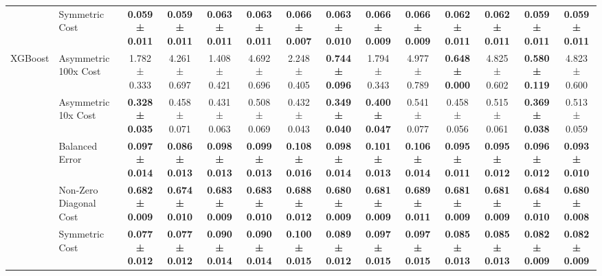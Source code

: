 \begin{table}[H]
{\begin{tabular}{llcccccccccccc}
 & Symmetric Cost & \textbf{0.059 ± 0.011} & \textbf{0.059 ± 0.011} & \textbf{0.063 ± 0.011} & \textbf{0.063 ± 0.011} & \textbf{0.066 ± 0.007} & \textbf{0.063 ± 0.010} & \textbf{0.066 ± 0.009} & \textbf{0.066 ± 0.009} & \textbf{0.062 ± 0.011} & \textbf{0.062 ± 0.011} & \textbf{0.059 ± 0.011} & \textbf{0.059 ± 0.011} \\
\cline{1-14}
\multirow[t]{5}{*}{XGBoost} & Asymmetric 100x Cost & 1.782 ± 0.333 & 4.261 ± 0.697 & 1.408 ± 0.421 & 4.692 ± 0.696 & 2.248 ± 0.405 & \textbf{0.744 ± 0.096} & 1.794 ± 0.343 & 4.977 ± 0.789 & \textbf{0.648 ± 0.000} & 4.825 ± 0.602 & \textbf{0.580 ± 0.119} & 4.823 ± 0.600 \\
 & Asymmetric 10x Cost & \textbf{0.328 ± 0.035} & 0.458 ± 0.071 & 0.431 ± 0.063 & 0.508 ± 0.069 & 0.432 ± 0.043 & \textbf{0.349 ± 0.040} & \textbf{0.400 ± 0.047} & 0.541 ± 0.077 & 0.458 ± 0.056 & 0.515 ± 0.061 & \textbf{0.369 ± 0.038} & 0.513 ± 0.059 \\
 & Balanced Error & \textbf{0.097 ± 0.014} & \textbf{0.086 ± 0.013} & \textbf{0.098 ± 0.013} & \textbf{0.099 ± 0.013} & \textbf{0.108 ± 0.016} & \textbf{0.098 ± 0.014} & \textbf{0.101 ± 0.013} & \textbf{0.106 ± 0.014} & \textbf{0.095 ± 0.011} & \textbf{0.095 ± 0.012} & \textbf{0.096 ± 0.012} & \textbf{0.093 ± 0.010} \\
 & Non-Zero Diagonal Cost & \textbf{0.682 ± 0.009} & \textbf{0.674 ± 0.010} & \textbf{0.683 ± 0.009} & \textbf{0.683 ± 0.010} & \textbf{0.688 ± 0.012} & \textbf{0.680 ± 0.009} & \textbf{0.681 ± 0.009} & \textbf{0.689 ± 0.011} & \textbf{0.681 ± 0.009} & \textbf{0.681 ± 0.009} & \textbf{0.684 ± 0.010} & \textbf{0.680 ± 0.008} \\
 & Symmetric Cost & \textbf{0.077 ± 0.012} & \textbf{0.077 ± 0.012} & \textbf{0.090 ± 0.014} & \textbf{0.090 ± 0.014} & \textbf{0.100 ± 0.015} & \textbf{0.089 ± 0.012} & \textbf{0.097 ± 0.015} & \textbf{0.097 ± 0.015} & \textbf{0.085 ± 0.013} & \textbf{0.085 ± 0.013} & \textbf{0.082 ± 0.009} & \textbf{0.082 ± 0.009} \\
\cline{1-14}
\bottomrule
\end{tabular}
    }
\end{table}

